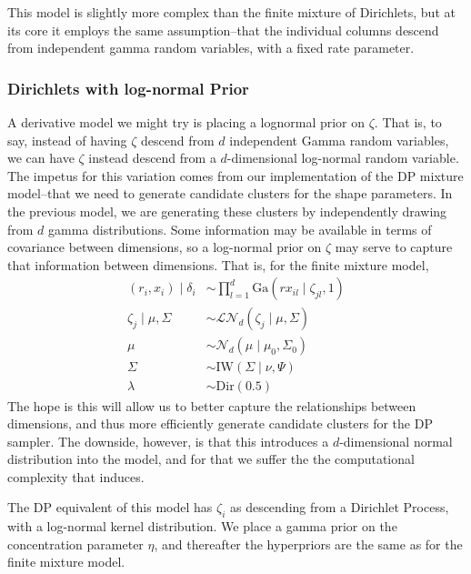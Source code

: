 This model is slightly more complex than the finite mixture of Dirichlets, but at its core it
  employs the same assumption--that the individual columns descend from independent gamma random
  variables, with a fixed rate parameter.

\subsubsection{Dirichlets with log-normal Prior}
A derivative model we might try is placing a lognormal prior on $\zeta$.  That is, to say, instead
  of having $\zeta$ descend from $d$ independent Gamma random variables, we can have $\zeta$ instead
  descend from a $d$-dimensional log-normal random variable.  The impetus for this variation comes
  from our implementation of the DP mixture model--that we need to generate candidate clusters for
  the shape parameters.  In the previous model, we are generating these clusters by independently
  drawing from $d$ gamma distributions.  Some information may be available in terms of covariance
  between dimensions, so a log-normal prior on $\zeta$ may serve to capture that information between
  dimensions.  That is, for the finite mixture model,
  \begin{equation}
    \label{model:mgdln}
    \begin{aligned}
      (r_i, x_i) \mid \delta_i &\sim \prod_{l = 1}^d\text{Ga}(rx_{il}\mid \zeta_{jl}, 1)\\
        \zeta_{j} \mid \mu, \Sigma &\sim \mathcal{LN}_d\left(\zeta_j\mid\mu,\Sigma\right)\\
        \mu &\sim \mathcal{N}_d\left(\mu\mid\mu_0,\Sigma_0\right)\\
        \Sigma &\sim \text{IW}\left(\Sigma\mid\nu,\Psi\right) \\
        \lambda &\sim \text{Dir}(0.5)
    \end{aligned}
  \end{equation}
  The hope is this will allow us to better capture the relationships between dimensions, and thus
  more efficiently generate candidate clusters for the DP sampler.  The downside, however, is that
  this introduces a $d$-dimensional normal distribution into the model, and for that we suffer the
  the computational complexity that induces.

  The DP equivalent of this model has $\zeta_i$ as descending from a Dirichlet Process, with a
    log-normal kernel distribution.  We place a gamma prior on the concentration parameter $\eta$,
    and thereafter the hyperpriors are the same as for the finite mixture model.

